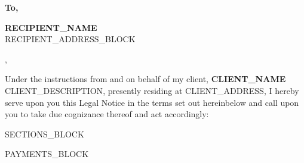 \documentclass[12pt,a4paper]{article}
\begin{document}
\color{textPrimary}
\justifying



\vspace{2mm}

\noindent\textbf{To,}

\vspace{3mm}

\noindent
\textbf{{{RECIPIENT_NAME}}}\\
{{RECIPIENT_ADDRESS_BLOCK}}

\vspace{5mm}


\vspace{3mm}


\vspace{3mm}

,

\vspace{3mm}

\noindent
Under the instructions from and on behalf of my client, \textbf{{{CLIENT_NAME}}}
{{CLIENT_DESCRIPTION}}, presently residing at {{CLIENT_ADDRESS}}, I hereby serve
upon you this Legal Notice in the terms set out hereinbelow and call upon you to
take due cognizance thereof and act accordingly:

\vspace{2mm}

{{SECTIONS_BLOCK}}

{{PAYMENTS_BLOCK}}
\end{document}
